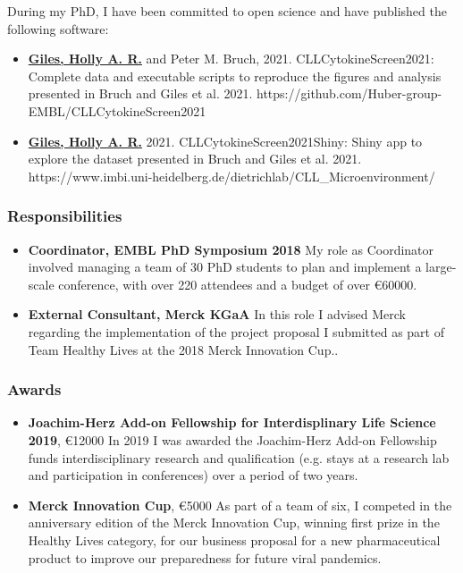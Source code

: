 \documentclass[11pt, a4paper, twosided]{book}
\begin{document}
    During my PhD, I have been committed to open science and have published the following software:
    \begin{itemize}
      \item \textbf{\underline{Giles, Holly A. R.}} and Peter M. Bruch, 2021. CLLCytokineScreen2021: Complete data and executable scripts to reproduce the figures and analysis presented in Bruch and Giles et al. 2021. https://github.com/Huber-group-EMBL/CLLCytokineScreen2021
      
      \item \textbf{\underline{Giles, Holly A. R.}} 2021. CLLCytokineScreen2021Shiny: Shiny app to explore the dataset presented in Bruch and Giles et al. 2021. https://www.imbi.uni-heidelberg.de/dietrichlab/CLL_Microenvironment/
    \end{itemize}
    \hypertarget{responsibilities}{%
    \subsubsection{Responsibilities}\label{responsibilities}}
    \begin{itemize}
      \item \textbf{Coordinator, EMBL PhD Symposium 2018} My role as Coordinator involved managing a team of 30 PhD students to plan and implement a large-scale conference, with over 220 attendees and a budget of over \euro{60000}. 
      \item \textbf{External Consultant, Merck KGaA} In this role I advised Merck regarding the implementation of the project proposal I submitted as part of Team Healthy Lives at the 2018 Merck Innovation Cup..
    \end{itemize}
    \hypertarget{awards}{%
    \subsubsection{Awards}\label{awards}}
    \begin{itemize}
      \item \textbf{Joachim-Herz Add-on Fellowship for Interdisplinary Life Science 2019}, \euro{12000} In 2019 I was awarded the Joachim-Herz Add-on Fellowship funds interdisciplinary research and qualification (e.g. stays at a research lab and participation in conferences) over a period of two years.
      \item \textbf{Merck Innovation Cup}, \euro{5000} As part of a team of six, I competed in the anniversary edition of the Merck Innovation Cup, winning first prize in the Healthy Lives category, for our business proposal for a new pharmaceutical product to improve our preparedness for future viral pandemics.
    \end{itemize}
\newpage\null\newpage
\end{document}
